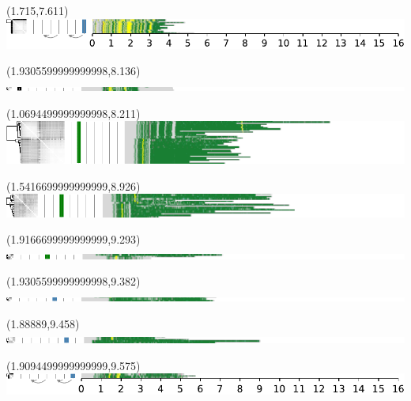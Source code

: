 \documentclass{article}
\begin{document}
\begin{textblock}{13}(1.715,7.611)\includegraphics{./Figure_S5/chr12-HG007.pdf}\end{textblock}
\begin{textblock}{13}(1.9305599999999998,8.136)\includegraphics{./Figure_S5/14qtel_1-500K_1_12_12_rc-HG001.pdf}\end{textblock}
\begin{textblock}{13}(1.0694499999999998,8.211)\includegraphics{./Figure_S5/14qtel_1-500K_1_12_12_rc-HG002.pdf}\end{textblock}
\begin{textblock}{13}(1.5416699999999999,8.926)\includegraphics{./Figure_S5/14qtel_1-500K_1_12_12_rc-HG003.pdf}\end{textblock}
\begin{textblock}{13}(1.9166699999999999,9.293)\includegraphics{./Figure_S5/14qtel_1-500K_1_12_12_rc-HG004.pdf}\end{textblock}
\begin{textblock}{13}(1.9305599999999998,9.382)\includegraphics{./Figure_S5/14qtel_1-500K_1_12_12_rc-HG005.pdf}\end{textblock}
\begin{textblock}{13}(1.88889,9.458)\includegraphics{./Figure_S5/14qtel_1-500K_1_12_12_rc-HG006.pdf}\end{textblock}
\begin{textblock}{13}(1.9094499999999999,9.575)\includegraphics{./Figure_S5/14qtel_1-500K_1_12_12_rc-HG007.pdf}\end{textblock}
\end{document}
